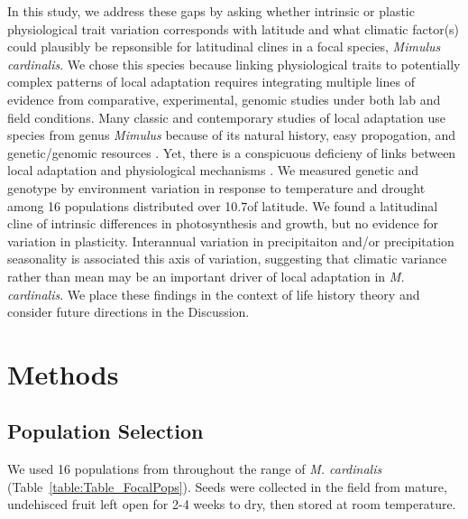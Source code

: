 \documentclass[11pt, oneside]{article}
\begin{document}
In this study, we address these gaps by asking whether intrinsic or plastic physiological trait variation corresponds with latitude and what climatic factor(s) could plausibly be repsonsible for latitudinal clines in a focal species, \textit{Mimulus cardinalis}. We chose this species because linking physiological traits to potentially complex patterns of local adaptation requires integrating multiple lines of evidence from comparative, experimental, genomic studies under both lab and field conditions. Many classic and contemporary studies of local adaptation use species from genus \textit{Mimulus} because of its natural history, easy propogation, and genetic/genomic resources \citep{Clausen_etal_1940, Hiesey_etal_1971, Bradshaw_Schemske_2003, Wu_etal_2008, Lowry_Willis_2010, Wright_etal_2013}. Yet, there is a conspicuous deficieny of links between local adaptation and physiological mechanisms \citep{Angert_2006, Angert_etal_2008, Wu_etal_2010}. We measured genetic and genotype by environment variation in response to temperature and drought among 16 populations distributed over 10.7\textdegree of latitude. We found a latitudinal cline of intrinsic differences in photosynthesis and growth, but no evidence for variation in plasticity. Interannual variation in precipitaiton and/or precipitation seasonality is associated this axis of variation, suggesting that climatic variance rather than mean may be an important driver of local adaptation in \textit{M. cardinalis}. We place these findings in the context of life history theory and consider future directions in the Discussion.

\section*{Methods}

\subsection*{Population Selection}

We used 16 populations from throughout the range of \textit{M. cardinalis} (Table~\ref{table:Table_FocalPops}). Seeds were collected in the field from mature, undehisced fruit left open for 2-4 weeks to dry, then stored at room temperature.


\end{document}
